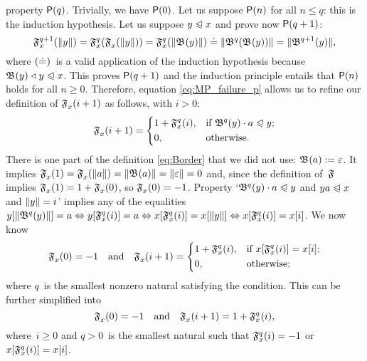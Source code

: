 property \(\textsf{P}({q})\). Trivially, we have \(\textsf{P}({0})\). Let us
suppose \(\textsf{P}({n})\) for all \(n \leqslant q\): this is the
induction hypothesis. Let us suppose \(y \mathrel{\trianglelefteqslant} x\) and prove now
\(\textsf{P}({q+1})\):
\begin{equation*}
  \mathfrak{F}_{x}^{q+1}(\lVert{y}\rVert{})
= \mathfrak{F}_{x}^{q}(\mathfrak{F}_{x}^{}(\lVert{y}\rVert{})) 
= \mathfrak{F}_{x}^{q}(\lVert{\mathfrak{B}^{}(y)}\rVert{})
\doteq \lVert{\mathfrak{B}^{q}(\mathfrak{B}^{}(y))}\rVert{}
= \lVert{\mathfrak{B}^{q+1}(y)}\rVert{},
\end{equation*}
where \((\smash{\doteq})\)~is a valid application of the induction
hypothesis because \(\mathfrak{B}^{}(y) \mathrel{\triangleleft} y \mathrel{\trianglelefteqslant} x\). This proves
\(\textsf{P}({q+1})\) and the induction principle entails that
\(\textsf{P}({n})\) holds for all \(n \geqslant 0\). Therefore, equation
\eqref{eq:MP_failure_p} allows us to refine our definition of
\(\mathfrak{F}_{x}^{}(i+1)\) as follows, with \(i>0\):
\begin{equation*}
\mathfrak{F}_{x}^{}(i+1) =
\left\{
  \begin{aligned}
   & 1 + \mathfrak{F}_{x}^{q}(i),
   && \text{if \(\mathfrak{B}^{q}(y) \cdot a \mathrel{\trianglelefteqslant}y\)};\\
   & 0,
   && \text{otherwise.}
  \end{aligned}
\right.
\end{equation*}
There is one part of the definition \eqref{eq:Border}
 that we did not use: \({\mathfrak{B}^{}(a) :=
  \varepsilon}\). It implies \(\mathfrak{F}_{x}^{}(1) =
\mathfrak{F}_{x}^{}(\lVert{a}\rVert{}) = \lVert{\mathfrak{B}^{}(a)}\rVert{} = \lVert{\varepsilon}\rVert{} =
0\) and, since the definition of~\(\mathfrak{F}\) implies
\(\mathfrak{F}_{x}^{}(1) = 1 + \mathfrak{F}_{x}^{}(0)\), so
\(\mathfrak{F}_{x}^{}(0) = -1\). Property `\(\mathfrak{B}^{q}(y) \cdot a \mathrel{\trianglelefteqslant}
y\) and \({ya \mathrel{\trianglelefteqslant} x}\) and \({\lVert{y}\rVert{} = i}\)' implies any of the
equalities \(\smash{{y}[{\lVert{\mathfrak{B}^{q}(y)}\rVert{}}]} = a \Leftrightarrow
\smash{{y}[{\mathfrak{F}_{x}^{q}(i)}]} = a \Leftrightarrow
\smash{{x}[{\mathfrak{F}_{x}^{q}(i)}]} = \smash{{x}[{\lVert{y}\rVert{}}]}
\Leftrightarrow \smash{{x}[{\mathfrak{F}_{x}^{q}(i)}]} = {x}[{i}]\).
We now know
\begin{equation*}
 \mathfrak{F}_{x}^{}(0)   = -1\quad\text{and}\quad
 \mathfrak{F}_{x}^{}(i+1) =
   \left\{
     \begin{aligned}
       & 1 + \mathfrak{F}_{x}^{q}(i),
       && \text{if \({x}[{\mathfrak{F}_{x}^{q}(i)}] = {x}[{i}]\)};\\
       & 0,
       && \text{otherwise;}
     \end{aligned}
   \right.
\end{equation*}
where \(q\)~is the smallest nonzero natural satisfying the
condition. This can be further simplified into
\begin{equation*}
\mathfrak{F}_{x}^{}(0) = -1
\quad \text{and} \quad
\mathfrak{F}_{x}^{}(i+1) = 1 + \mathfrak{F}_{x}^{q}(i),
\end{equation*}
where~\(i \geqslant 0\) and \(q>0\)~is the smallest natural such that
\(\mathfrak{F}_{x}^{q}(i) = -1\) or \(\smash{{x}[{\mathfrak{F}_{x}^{q}(i)}]}
= {x}[{i}]\).

